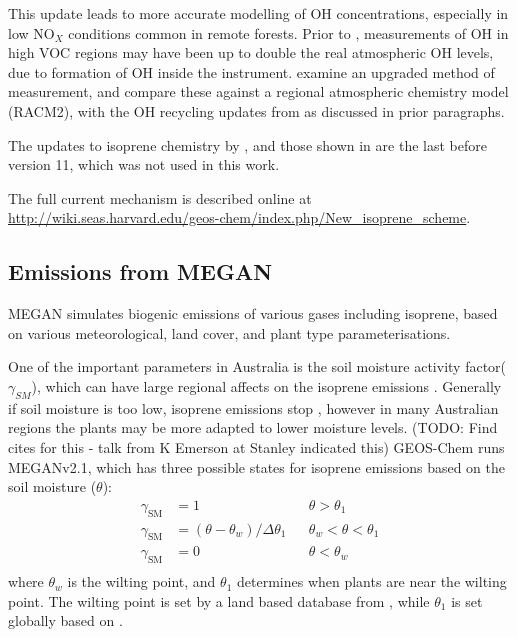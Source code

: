     This update leads to more accurate modelling of OH concentrations, especially in low NO$_X$ conditions common in remote forests.
    Prior to \citet{Mao2012}, measurements of OH in high VOC regions may have been up to double the real atmospheric OH levels, due to formation of OH inside the instrument.
    \citet{Mao2012} examine an upgraded method of measurement, and compare these against a regional atmospheric chemistry model (RACM2), with the OH recycling updates from \citet{Paulot2009b} as discussed in prior paragraphs.
    
    The updates to isoprene chemistry by \citet{Mao2013}, and those shown in \cite{Crounse2011,Crounse2012} are the last before version 11, which was not used in this work.

    The full current mechanism is described online at \url{http://wiki.seas.harvard.edu/geos-chem/index.php/New_isoprene_scheme}.
    
  \subsection{Emissions from MEGAN}
    MEGAN simulates biogenic emissions of various gases including isoprene, based on various meteorological, land cover, and plant type parameterisations.
    
    One of the important parameters in Australia is the soil moisture activity factor($\gamma_{SM}$), which can have large regional affects on the isoprene emissions \citep{Sindelarova2014,Bauwens2016}.
    Generally if soil moisture is too low, isoprene emissions stop \citep{Pegoraro2004,Niinemets2010}, however in many Australian regions the plants may be more adapted to lower moisture levels. (TODO: Find cites for this - talk from K Emerson at Stanley indicated this)
    GEOS-Chem runs MEGANv2.1, which has three possible states for isoprene emissions based on the soil moisture ($\theta$):
    \begin{align*}
      \gamma_\mathrm{SM} & = 1 && \theta > \theta_1 \\
      \gamma_\mathrm{SM} & = (\theta-\theta_w)/\Delta\theta_1  && \theta_w < \theta < \theta_1 \\
      \gamma_\mathrm{SM} & = 0 && \theta < \theta_w \\
    \end{align*}
    where $\theta_w$ is the wilting point, and $\theta_1$ determines when plants are near the wilting point.
    The wilting point is set by a land based database from \citet{Chen2001}, while $\theta_1$ is set globally based on \citet{Pegoraro2004}.
    
